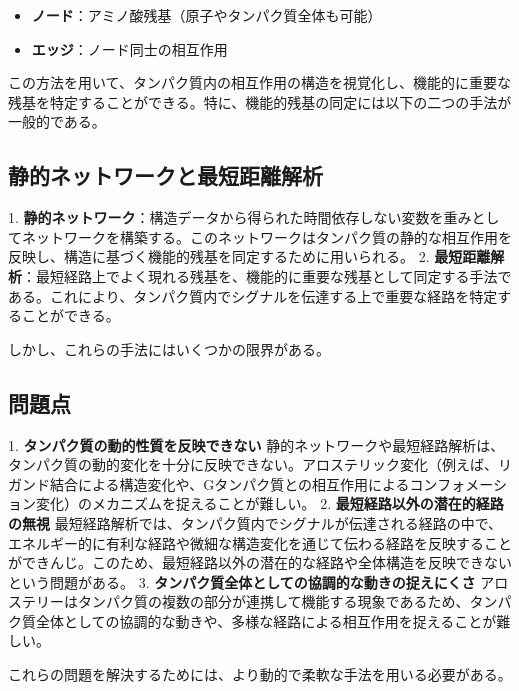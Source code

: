 \begin{itemize}
    \item \textbf{ノード}：アミノ酸残基（原子やタンパク質全体も可能）
    \item \textbf{エッジ}：ノード同士の相互作用
\end{itemize}

この方法を用いて、タンパク質内の相互作用の構造を視覚化し、機能的に重要な残基を特定することができる。特に、機能的残基の同定には以下の二つの手法が一般的である。

\subsection*{静的ネットワークと最短距離解析}

1. \textbf{静的ネットワーク}：構造データから得られた時間依存しない変数を重みとしてネットワークを構築する。このネットワークはタンパク質の静的な相互作用を反映し、構造に基づく機能的残基を同定するために用いられる。
2. \textbf{最短距離解析}：最短経路上でよく現れる残基を、機能的に重要な残基として同定する手法である。これにより、タンパク質内でシグナルを伝達する上で重要な経路を特定することができる。

しかし、これらの手法にはいくつかの限界がある。

\subsection*{問題点}

1. \textbf{タンパク質の動的性質を反映できない}  
   静的ネットワークや最短経路解析は、タンパク質の動的変化を十分に反映できない。アロステリック変化（例えば、リガンド結合による構造変化や、Gタンパク質との相互作用によるコンフォメーション変化）のメカニズムを捉えることが難しい。
2. \textbf{最短経路以外の潜在的経路の無視}  
   最短経路解析では、タンパク質内でシグナルが伝達される経路の中で、エネルギー的に有利な経路や微細な構造変化を通じて伝わる経路を反映することができんじ。このため、最短経路以外の潜在的な経路や全体構造を反映できないという問題がある。
3. \textbf{タンパク質全体としての協調的な動きの捉えにくさ}  
   アロステリーはタンパク質の複数の部分が連携して機能する現象であるため、タンパク質全体としての協調的な動きや、多様な経路による相互作用を捉えることが難しい。

これらの問題を解決するためには、より動的で柔軟な手法を用いる必要がある。